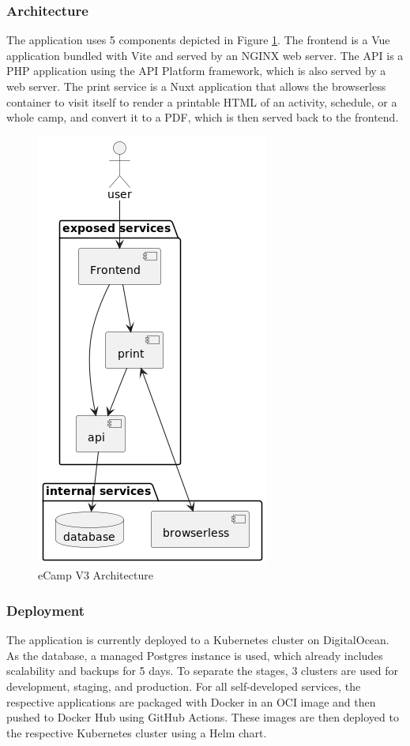 \documentclass[conference]{IEEEtran}
\begin{document}
\subsubsection{Architecture}

The application uses 5 components depicted in Figure \ref{fig:ecamp3-architecture}.
The frontend is a Vue application bundled with Vite and served by an NGINX web server.
The API is a PHP application using the API Platform framework, which is also served by a web server.
The print service is a Nuxt application that allows the browserless container to visit itself to render
a printable HTML of an activity, schedule, or a whole camp, and convert it to a PDF, which is then served back to the frontend.

\begin{figure}[h!]
	\centering
	\includegraphics[height=\columnwidth]{sections/assets/ecamp3-architecture}
	\caption{eCamp V3 Architecture}
	\label{fig:ecamp3-architecture}
\end{figure}

\subsubsection{Deployment}

The application is currently deployed to a Kubernetes cluster on DigitalOcean.
As the database, a managed Postgres instance is used, which already includes scalability and backups for 5 days.
To separate the stages, 3 clusters are used for development, staging, and production.
For all self-developed services, the respective applications are packaged with Docker in an OCI image and then
pushed to Docker Hub using GitHub Actions\cite{ecamp3-reusable-build-and-push}.
These images are then deployed to the respective Kubernetes cluster using a Helm chart\cite{ecamp3-reusable-dev-deployment, ecamp3-deployment-stage-prod}.
\end{document}
